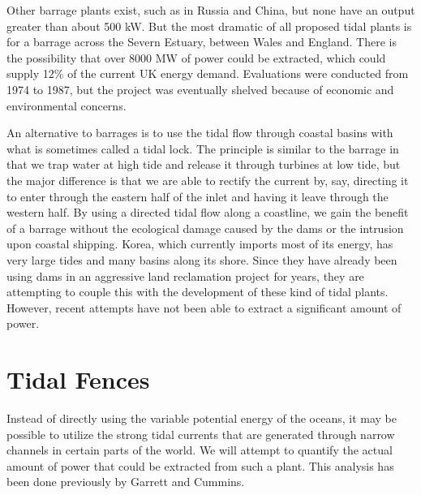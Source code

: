 \documentclass[11pt]{article}
\begin{document}
Other barrage plants exist, such as in Russia and China, but none have an output greater than about 500 kW. But the most dramatic of all proposed tidal plants is for a barrage across the Severn Estuary, between Wales and England. There is the possibility that over 8000 MW of power could be extracted, which could supply 12\% of the current UK energy demand. Evaluations were conducted from 1974 to 1987, but the project was eventually shelved because of economic and environmental concerns.

An alternative to barrages is to use the tidal flow through coastal basins with what is sometimes called a tidal lock. The principle is similar to the barrage in that we trap water at high tide and release it through turbines at low tide, but the major difference is that we are able to rectify the current by, say, directing it to enter through the eastern half of the inlet and having it leave through the western half. By using a directed tidal flow along a coastline, we gain the benefit of a barrage without the ecological damage caused by the dams or the intrusion upon coastal shipping. Korea, which currently imports most of its energy, has very large tides and many basins along its shore. Since they have already been using dams in an aggressive land reclamation project for years, they are attempting to couple this with the development of these kind of tidal plants. However, recent attempts have not been able to extract a significant amount of power.


\section{Tidal Fences}
\label{TidalFences}

Instead of directly using the variable potential energy of the oceans, it may be possible to utilize the strong tidal currents that are generated through narrow channels in certain parts of the world. We will attempt to quantify the actual amount of power that could be extracted from such a plant. This analysis has been done previously by Garrett and Cummins.\cite{Garrett2004}
\end{document}
